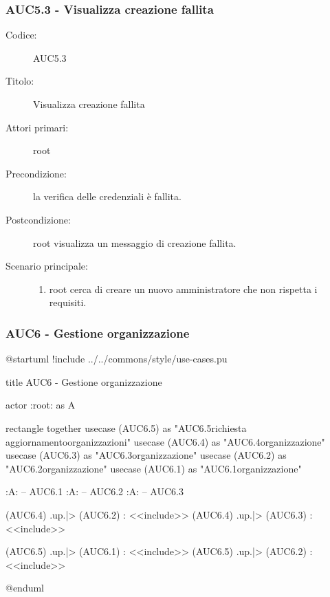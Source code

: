 \documentclass[casi-duso]{subfiles}
\begin{document}
\subsubsection{AUC5.3 - Visualizza creazione fallita}%
\label{subsub:AUC5.3}
\begin{description}
  \item[Codice:] AUC5.3
  \item[Titolo:] Visualizza creazione fallita
  \item[Attori primari:] root
  \item[Precondizione:] la verifica delle credenziali è fallita.
  \item[Postcondizione:] root visualizza un messaggio di creazione fallita.
  \item[Scenario principale:]
  \begin{enumerate}
    \item root cerca di creare un nuovo amministratore che non rispetta i requisiti.
  \end{enumerate}
\end{description}

\subsubsection{AUC6 - Gestione organizzazione}%
\label{subsub:AUC6}

\begin{plantuml}
@startuml 
!include ../../commons/style/use-cases.pu

title AUC6 - Gestione organizzazione

actor :root: as A

rectangle {
  together {
    usecase (AUC6.5) as "AUC6.5\nInvio richiesta aggiornamento\nlista organizzazioni"
    usecase (AUC6.4) as "AUC6.4\nSeleziona organizzazione"
    usecase (AUC6.3) as "AUC6.3\nModifica organizzazione"
    usecase (AUC6.2) as "AUC6.2\nEliminazione organizzazione"
    usecase (AUC6.1) as "AUC6.1\nCreazione organizzazione"
  }
}

:A: -- AUC6.1
:A: -- AUC6.2
:A: -- AUC6.3

(AUC6.4) .up.|> (AUC6.2) : <<include>>
(AUC6.4) .up.|> (AUC6.3) : <<include>>

(AUC6.5) .up.|> (AUC6.1) : <<include>>
(AUC6.5) .up.|> (AUC6.2) : <<include>>

@enduml
\end{plantuml}
\end{document}
